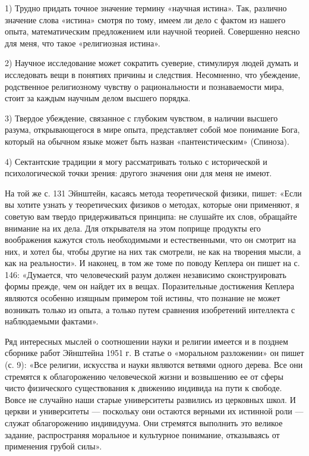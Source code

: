 1) Трудно придать точное значение термину «научная истина». Так, различно
значение слова «истина» смотря по тому, имеем ли дело с фактом из нашего опыта,
математическим предложением или научной теорией. Совершенно неясно для меня,
что такое «религиозная истина».

2) Научное исследование может сократить суеверие, стимулируя людей думать и
исследовать вещи в понятиях причины и следствия. Несомненно, что убеждение,
родственное религиозному чувству о рациональности и познаваемости мира, стоит
за каждым научным делом высшего порядка.

3) Твердое убеждение, связанное с глубоким чувством, в наличии высшего разума,
открывающегося в мире опыта, представляет собой мое понимание Бога, который на
обычном языке может быть назван «пантеистическим» (Спиноза).

4) Сектантские традиции я могу рассматривать только с исторической и
психологической точки зрения: другого значения они для меня не имеют.

На той же с. 131 Эйнштейн, касаясь метода теоретической физики, пишет: «Если вы
хотите узнать у теоретических физиков о методах, которые они применяют, я
советую вам твердо придерживаться принципа: не слушайте их слов, обращайте
внимание на их дела. Для открывателя на этом поприще продукты его воображения
кажутся столь необходимыми и естественными, что он смотрит на них, и хотел бы,
чтобы другие на них так смотрели, не как на творения мысли, а как на
реальности». И наконец, в том же томе по поводу Кеплера он пишет на с. 146:
«Думается, что человеческий разум должен независимо сконструировать формы
прежде, чем он найдет их в вещах. Поразительные достижения Кеплера являются
особенно изящным примером той истины, что познание не может возникать только из
опыта, а только путем сравнения изобретений интеллекта с наблюдаемыми фактами».

Ряд интересных мыслей о соотношении науки и религии имеется и в позднем
сборнике работ Эйнштейна 1951 г. В статье о «моральном разложении» он пишет (с.
9): «Все религии, искусства и науки являются ветвями одного дерева. Все они
стремятся к облагорожению человеческой жизни и возвышению ее от сферы чисто
физического существования к движению индивида на пути к свободе. Вовсе не
случайно наши старые университеты развились из церковных школ. И церкви и
университеты --- поскольку они остаются верными их истинной роли --- служат
облагорожению индивидуума. Они стремятся выполнить это великое задание,
распространяя моральное и культурное понимание, отказываясь от применения
грубой силы».

